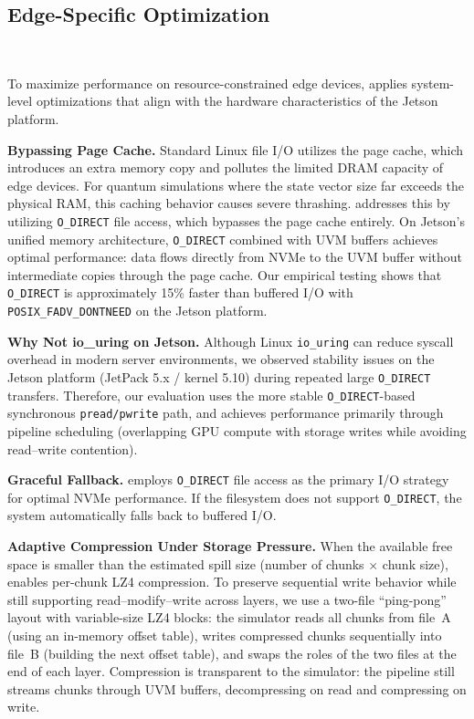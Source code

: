 \subsection{Edge-Specific Optimization}~\label{design_4}

To maximize performance on resource-constrained edge devices, \EdgeQuantum applies system-level optimizations that align with the hardware characteristics of the Jetson platform.

\noindent\textbf{Bypassing Page Cache.}
Standard Linux file I/O utilizes the page cache, which introduces an extra memory copy and pollutes the limited DRAM capacity of edge devices.
For quantum simulations where the state vector size far exceeds the physical RAM, this caching behavior causes severe thrashing.
\EdgeQuantum addresses this by utilizing \texttt{O\_DIRECT} file access, which bypasses the page cache entirely.
On Jetson's unified memory architecture, \texttt{O\_DIRECT} combined with UVM buffers achieves optimal performance: data flows directly from NVMe to the UVM buffer without intermediate copies through the page cache.
Our empirical testing shows that \texttt{O\_DIRECT} is approximately 15\% faster than buffered I/O with \texttt{POSIX\_FADV\_DONTNEED} on the Jetson platform.

\noindent\textbf{Why Not io\_uring on Jetson.}
Although Linux \texttt{io\_uring} can reduce syscall overhead in modern server environments, we observed stability issues on the Jetson platform (JetPack 5.x / kernel 5.10) during repeated large \texttt{O\_DIRECT} transfers.
Therefore, our evaluation uses the more stable \texttt{O\_DIRECT}-based synchronous \texttt{pread/pwrite} path, and achieves performance primarily through pipeline scheduling (overlapping GPU compute with storage writes while avoiding read--write contention).

\noindent\textbf{Graceful Fallback.}
\EdgeQuantum employs \texttt{O\_DIRECT} file access as the primary I/O strategy for optimal NVMe performance.
If the filesystem does not support \texttt{O\_DIRECT}, the system automatically falls back to buffered I/O.

\noindent\textbf{Adaptive Compression Under Storage Pressure.}
When the available free space is smaller than the estimated spill size (number of chunks $\times$ chunk size), \EdgeQuantum enables per-chunk LZ4 compression.
To preserve sequential write behavior while still supporting read--modify--write across layers, we use a two-file ``ping-pong'' layout with variable-size LZ4 blocks: the simulator reads all chunks from file~A (using an in-memory offset table), writes compressed chunks sequentially into file~B (building the next offset table), and swaps the roles of the two files at the end of each layer.
Compression is transparent to the simulator: the pipeline still streams chunks through UVM buffers, decompressing on read and compressing on write.

